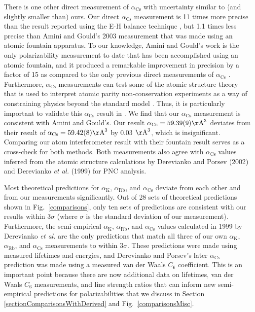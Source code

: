 \documentclass[twocolumn,pra,showpacs,superscriptaddress,longbibliography]{revtex4-1}   %
\newcommand{\figref}[1]{Fig.~\ref{#1}}
\newcommand{\ak}{\alpha_{\textrm{K}}}
\newcommand{\arb}{\alpha_{\textrm{Rb}}}
\newcommand{\acs}{\alpha_{\textrm{Cs}}}
\newcommand{\polCsSysOnly}{59.39(9)}
\newcommand{\etalspace}{\textit{et al. }}
\newcommand{\AAA}{\mathrm{\AA}}
\begin{document}
There is one other direct measurement of $\acs$ with uncertainty similar to (and slightly smaller than) ours.  Our direct $\acs$ measurement is 11 times more precise than the result reported using the E-H balance technique \cite{Molof1974a}, but 1.1 times less precise than Amini and Gould's 2003 measurement \cite{Amini2003} that was made using an atomic fountain apparatus.
To our knowledge, Amini and Gould's work is the only polarizability measurement to date that has been accomplished using an atomic fountain, and it produced a remarkable improvement in precision by a factor of 15 as compared to the only previous direct measurements of $\acs$ \cite{Molof1974a,Hall1974}.  Furthermore, $\acs$ measurements can test some of the atomic structure theory that is used to interpret atomic parity non-conservation experiments as a way of constraining physics beyond the standard model \cite{Blundell1992,Cho1997,Derevianko2001,Porsev2009}. Thus, it is particularly important to validate this $\acs$ result in \cite{Amini2003}.  We find that our $\acs$ measurement is consistent with Amini and Gould's.  Our result $\acs = \polCsSysOnly \AAA^3$ deviates from their result of $\acs = 59.42(8) \AAA^3$ by 0.03 $\AAA^3$, which is insignificant.  Comparing our atom interferometer result with their fountain result serves as a cross-check for both methods.
Both measurements also agree with $\acs$ values inferred from the atomic structure calculations by Derevianko and Porsev (2002) \cite{Derevianko2001} and Derevianko \etalspace (1999) \cite{Derevianko1998} for PNC analysis.




Most theoretical predictions for $\ak$, $\arb$, and $\acs$ deviate from each other and from our measurements significantly.   Out of 28 sets of theoretical predictions shown in \figref{comparisons}, only ten sets of predictions \cite{Derevianko1998,Derevianko2001,Iskrenova-Tchoukova2007,Safronova2008,Safronova2011,
Nandy2012,Jiang2013,Sahoo2013,
Safronova2013,Borschevsky2013} are consistent with our results within 3$\sigma$ (where $\sigma$ is the standard deviation of our measurement). Furthermore, the semi-empirical $\ak$, $\arb$, and $\acs$ values calculated in 1999 by Derevianko \etalspace \cite{Derevianko1998} are the only predictions that match all three of our own $\ak$, $\arb$, and $\acs$ measurements
to within 3$\sigma$. These predictions \cite{Derevianko1998} were made using measured lifetimes and energies, and Derevianko and Porsev's later $\acs$ prediction \cite{Derevianko2001} was made using a measured van der Waals $C_6$ coefficient.  This is an important point because there are now additional data on lifetimes, van der Waals $C_6$ measurements, and line strength ratios that can inform new semi-empirical predictions for polarizabilities that we discuss in Section \ref{sectionComparisonsWithDerived} and \figref{comparisonsMisc}.
\end{document}
